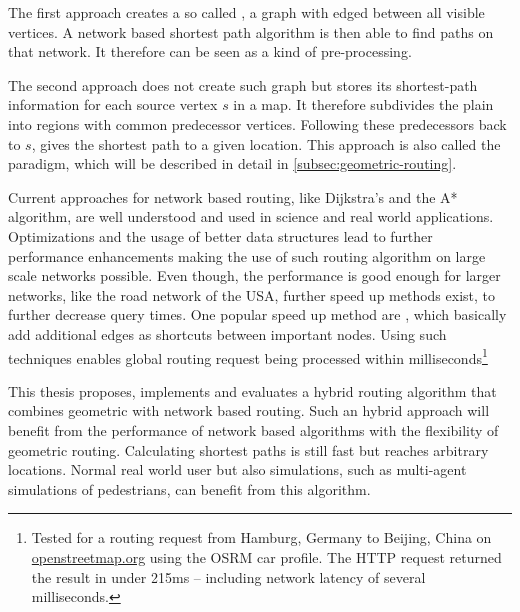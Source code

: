 The first approach creates a so called , a graph with edged between all visible vertices.
A network based shortest path algorithm is then able to find paths on that network\cite[2]{hershberger-suri}.
It therefore can be seen as a kind of pre-processing.

The second approach does not create such graph but stores its shortest-path information for each source vertex $s$ in a map.
It therefore subdivides the plain into regions with common predecessor vertices.
Following these predecessors back to $s$, gives the shortest path to a given location.
This approach is also called the  paradigm, which will be described in detail in \cref{subsec:geometric-routing}.

Current approaches for network based routing, like Dijkstra's and the A* algorithm, are well understood and used in science and real world applications.
Optimizations and the usage of better data structures lead to further performance enhancements making the use of such routing algorithm on large scale networks possible.
Even though, the performance is good enough for larger networks, like the road network of the USA\cite[5]{aviram-optimizing-dijkstra}, further speed up methods exist, to further decrease query times.
One popular speed up method are , which basically add additional edges as shortcuts between important nodes\cite{geisberger-contraction-hierarchies}.
Using such techniques enables global routing request being processed within milliseconds\footnote{Tested for a routing request from Hamburg, Germany to Beijing, China on \href{https://www.openstreetmap.org/directions?engine=fossgis\_osrm\_car&route=53.55\%2C10.00\%3B39.91\%2C116.39}{openstreetmap.org} using the OSRM car profile. The HTTP request returned the result in under 215ms -- including network latency of several milliseconds.}

This thesis proposes, implements and evaluates a hybrid routing algorithm that combines geometric with network based routing.
Such an hybrid approach will benefit from the performance of network based algorithms with the flexibility of geometric routing.
Calculating shortest paths is still fast but reaches arbitrary locations.
Normal real world user but also simulations, such as multi-agent simulations of pedestrians, can benefit from this algorithm.